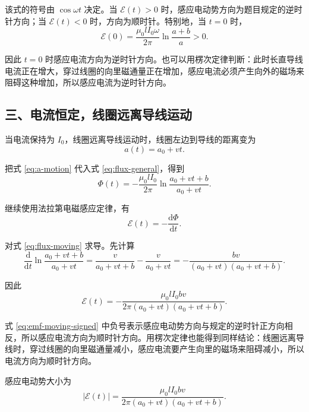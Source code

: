 \documentclass[11pt,a4paper,fontset=fandol]{ctexart}
\newcommand{\dd}{\mathrm{d}}
\newcommand{\emf}{\mathcal{E}}
\begin{document}
该式的符号由 $\cos\omega t$ 决定。当 $\mathcal E(t)>0$ 时，感应电动势方向为题目规定的逆时针方向；当 $\mathcal E(t)<0$ 时，方向为顺时针。特别地，当 $t=0$ 时，
\begin{equation}
 \emf(0)=\frac{\mu_0 l I_0\omega}{2\pi}\ln\frac{a+b}{a}>0.
 \label{eq:emf-zero}
\end{equation}

因此 $t=0$ 时感应电流方向为逆时针方向。也可以用楞次定律判断：此时长直导线电流正在增大，穿过线圈的向里磁通量正在增加，感应电流必须产生向外的磁场来阻碍这种增加，所以感应电流为逆时针方向。

\subsection*{三、电流恒定，线圈远离导线运动}
当电流保持为 $I_0$，线圈远离导线运动时，线圈左边到导线的距离变为
\begin{equation}
 a(t)=a_0+vt.
 \label{eq:a-motion}
\end{equation}

把式 \eqref{eq:a-motion} 代入式 \eqref{eq:flux-general}，得到
\begin{equation}
 \Phi(t)=-\frac{\mu_0 l I_0}{2\pi}\ln\frac{a_0+vt+b}{a_0+vt}.
 \label{eq:flux-moving}
\end{equation}

继续使用法拉第电磁感应定律，有
\begin{equation}
 \emf(t)=-\frac{\dd\Phi}{\dd t}.
 \label{eq:faraday-moving}
\end{equation}

对式 \eqref{eq:flux-moving} 求导。先计算
\begin{equation}
 \frac{\dd}{\dd t}\ln\frac{a_0+vt+b}{a_0+vt}
 =\frac{v}{a_0+vt+b}-\frac{v}{a_0+vt}
 =-\frac{bv}{(a_0+vt)(a_0+vt+b)}.
 \label{eq:log-derivative}
\end{equation}

因此
\begin{equation}
 \emf(t)=-\frac{\mu_0 l I_0 b v}{2\pi (a_0+vt)(a_0+vt+b)}.
 \label{eq:emf-moving-signed}
\end{equation}

式 \eqref{eq:emf-moving-signed} 中负号表示感应电动势方向与规定的逆时针正方向相反，所以感应电流方向为顺时针方向。用楞次定律也能得到同样结论：线圈远离导线时，穿过线圈的向里磁通量减小，感应电流要产生向里的磁场来阻碍减小，所以电流方向为顺时针方向。

感应电动势大小为
\begin{equation}
 |\emf(t)|=\frac{\mu_0 l I_0 b v}{2\pi (a_0+vt)(a_0+vt+b)}.
 \label{eq:emf-moving-magnitude}
\end{equation}
\end{document}
